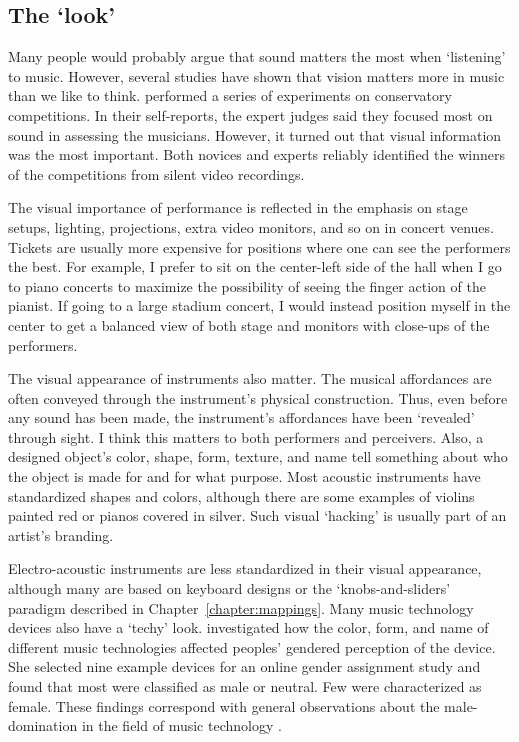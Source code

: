 \subsection{The `look'}

Many people would probably argue that sound matters the most when `listening' to music. However, several studies have shown that vision matters more in music than we like to think. \citet{tsay_sight_2013} performed a series of experiments on conservatory competitions. In their self-reports, the expert judges said they focused most on sound in assessing the musicians. However, it turned out that visual information was the most important. Both novices and experts reliably identified the winners of the competitions from silent video recordings.

The visual importance of performance is reflected in the emphasis on stage setups, lighting, projections, extra video monitors, and so on in concert venues. Tickets are usually more expensive for positions where one can see the performers the best. For example, I prefer to sit on the center-left side of the hall when I go to piano concerts to maximize the possibility of seeing the finger action of the pianist. If going to a large stadium concert, I would instead position myself in the center to get a balanced view of both stage and monitors with close-ups of the performers.

The visual appearance of instruments also matter. The musical affordances are often conveyed through the instrument's physical construction. Thus, even before any sound has been made, the instrument's affordances have been `revealed' through sight. I think this matters to both performers and perceivers. Also, a designed object's color, shape, form, texture, and name tell something about who the object is made for and for what purpose. Most acoustic instruments have standardized shapes and colors, although there are some examples of violins painted red or pianos covered in silver. Such visual `hacking' is usually part of an artist's branding.

Electro-acoustic instruments are less standardized in their visual appearance, although many are based on keyboard designs or the `knobs-and-sliders' paradigm described in Chapter~\ref{chapter:mappings}. Many music technology devices also have a `techy' look. \citet{jawad_gatekeepers_2020} investigated how the color, form, and name of different music technologies affected peoples' gendered perception of the device. She selected nine example devices for an online gender assignment study and found that most were classified as male or neutral. Few were characterized as female. These findings correspond with general observations about the male-domination in the field of music technology  \citep{essl_gender_2003,born_music_2015,gadir_forty-seven_2017}.

